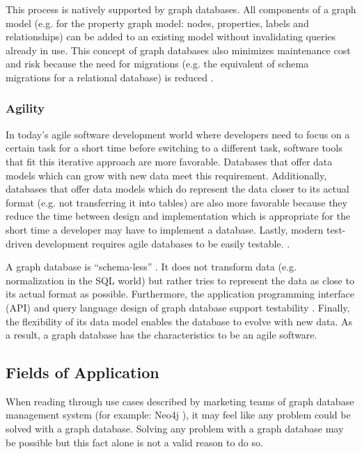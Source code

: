 This process is natively supported by graph databases. All components of a graph model (e.g. for the property graph model: nodes, properties, labels and relationships) can be added to an existing model without invalidating queries already in use. This concept of graph databases also minimizes maintenance cost and risk because the need for migrations (e.g. the equivalent of schema migrations for a relational database) is reduced \autocite{maheshlal2015, graphdb2015}.

\subsubsection{Agility}
In today's agile software development world where developers need to focus on a certain task for a short time before switching to a different task, software tools that fit this iterative approach are more favorable. Databases that offer data models which can grow with new data meet this requirement. Additionally, databases that offer data models which do represent the data closer to its actual format (e.g. not transferring it into tables) are also more favorable because they reduce the time between design and implementation which is appropriate for the short time a developer may have to implement a database. Lastly, modern test-driven development requires agile databases to be easily testable. \autocite{maheshlal2015, graphdb2015}.

A graph database is “schema-less” \autocite{maheshlal2015}. It does not transform data (e.g. normalization in the SQL world) but rather tries to represent the data as close to its actual format as possible. Furthermore, the application programming interface (API) and query language design of graph database support testability \autocite{graphdb2015} . Finally, the flexibility of its data model enables the database to evolve with new data. As a result, a graph database has the characteristics to be an agile software.

\subsection{Fields of Application} \label{section:FoA}
When reading through use cases described by marketing teams of graph database management system (for example: Neo4j \autocite{neo4j:why_graphdb, neo4j:use_cases}
), it may feel like any problem could be solved with a graph database. Solving any problem with a graph database may be possible but this fact alone is not a valid reason to do so.

